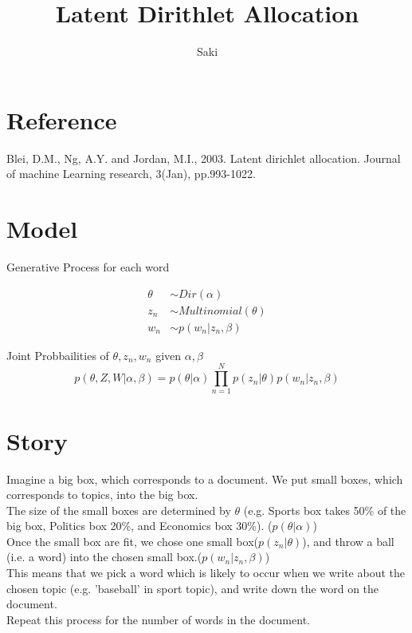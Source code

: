 \documentclass[a4paper, uplatex]{jsarticle} %
\title{Latent Dirithlet Allocation}
\author{Saki}
\begin{document}
\maketitle

\begin{abstract}
\end{abstract}

\section{Reference}
Blei, D.M., Ng, A.Y. and Jordan, M.I., 2003. Latent dirichlet allocation. Journal of machine Learning research, 3(Jan), pp.993-1022.

\section{Model}
Generative Process for each word 

\begin{align*}
\theta &\sim Dir(\alpha) \\
z_n &\sim Multinomial(\theta) \\
w_n &\sim p(w_n|z_n, \beta)
\end{align*}

Joint Probbailities of $\theta, z_n, w_n$ given $\alpha, \beta$
$$
p(\theta, Z, W| \alpha, \beta) = p(\theta | \alpha) \prod_{n=1}^N p(z_n|\theta) p(w_n|z_n, \beta)
$$

\section{Story}
Imagine a big box, which corresponds to a document. We put small boxes, which corresponds to topics, into the big box.\\ 
The size of the small boxes are determined by $\theta$ (e.g. Sports box takes 50\% of the big box, Politics box 20\%, and Economics box 30\%). ($p(\theta|\alpha)$) \\
Once the small box are fit, we chose one small box($p(z_n|\theta)$), and throw a ball (i.e. a word) into the chosen small box.($p(w_n|z_n,\beta)$) \\
This means that we pick a word which is likely to occur when we write about the chosen topic (e.g. 'baseball' in sport topic), and write down the word on the document. \\
Repeat this process for the number of words in the document. 
\end{document}
